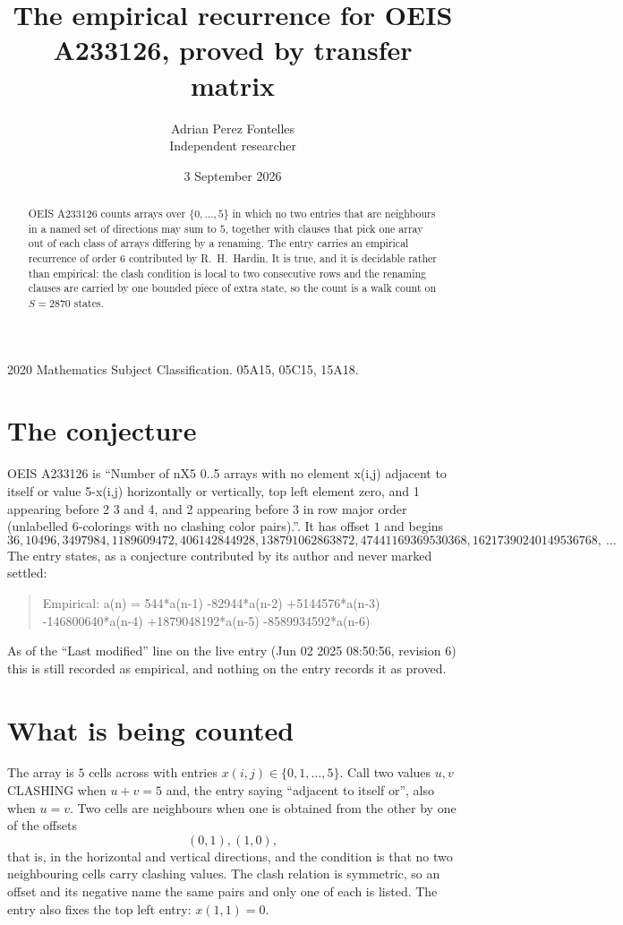 \documentclass[11pt,a4paper]{article}
\title{The empirical recurrence for OEIS A233126, proved by transfer matrix}
\author{Adrian Perez Fontelles\\ \small Independent researcher}
\date{3 September 2026}
\theoremstyle{plain}
\theoremstyle{definition}
\begin{document}
\maketitle

\begin{abstract}
OEIS A233126 counts arrays over $\{0,\dots,5\}$ in which no two entries that are neighbours in
a named set of directions may sum to $5$, together with clauses that pick one array out of
each class of arrays differing by a renaming. The entry carries an empirical recurrence of
order $6$ contributed by R.~H.~Hardin. It is true, and it is decidable rather than
empirical: the clash condition is local to two consecutive rows and the renaming clauses are
carried by one bounded piece of extra state, so the count is a walk count on $S=2870$ states.
\end{abstract}

\noindent\small 2020 Mathematics Subject Classification. 05A15, 05C15, 15A18.\normalsize

\section{The conjecture}

OEIS A233126 is ``Number of nX5 0..5 arrays with no element x(i,j) adjacent to itself or value 5-x(i,j) horizontally or vertically, top left element zero, and 1 appearing before 2 3 and 4, and 2 appearing before 3 in row major order (unlabelled 6-colorings with no clashing color pairs).''. It has offset $1$ and begins
\[
36, 10496, 3497984, 1189609472, 406142844928, 138791062863872, 47441169369530368, 16217390240149536768,\ \dots
\]
The entry states, as a conjecture contributed by its author and never marked settled:
\begin{quote}
Empirical: a(n) = 544*a(n-1) -82944*a(n-2) +5144576*a(n-3) -146800640*a(n-4) +1879048192*a(n-5) -8589934592*a(n-6)
\end{quote}
As of the ``Last modified'' line on the live entry (Jun 02 2025 08:50:56, revision 6) this is still
recorded as empirical, and nothing on the entry records it as proved.

\section{What is being counted}

The array is $5$ cells across with entries $x(i,j)\in\{0,1,\dots,5\}$. Call two values $u,v$ CLASHING
when $u+v=5$ and, the entry saying ``adjacent to itself or'', also when $u=v$. Two cells are neighbours when one is obtained from the other by one of
the offsets
\[
(0,1), (1,0),
\]
that is, in the horizontal and vertical directions, and the condition is that no two neighbouring cells carry
clashing values. The clash relation is symmetric, so an offset and its negative name the
same pairs and only one of each is listed. The entry also fixes the top left entry: $x(1,1)=0$.
\end{document}
